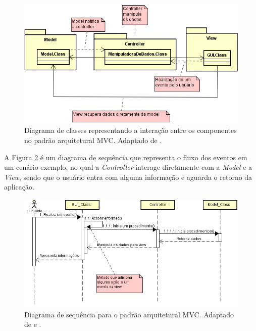 \begin{figure}[h!]
	\centering
	\includegraphics[keepaspectratio=true,scale=0.9]{figuras/DiagramaDeClasseMVC.PNG}
	\caption{Diagrama de classes representando a interação entre os componentes no padrão arquitetural MVC. Adaptado de \cite{durelli2008proposta}.}
	\label{DiagramaDeClasseMVC}
\end{figure}

\pagebreak

A Figura \ref{DiagramaDeSequenciaMVC} é um diagrama de sequência que representa o fluxo dos eventos em um cenário exemplo, no qual a \textit{Controller} interage diretamente com a \textit{Model} e a \textit{View}, sendo que o usuário entra com alguma informação e aguarda o retorno da aplicação. 


\begin{figure}[h!]
	\centering
	\includegraphics[keepaspectratio=true,scale=0.8]{figuras/DiagramaDeSequenciaMVC.PNG}
	\caption{Diagrama de sequência para o padrão arquitetural MVC. Adaptado de \cite{durelli2008proposta} e \cite{buschmann1996system}.}
	\label{DiagramaDeSequenciaMVC}
\end{figure}

\pagebreak

